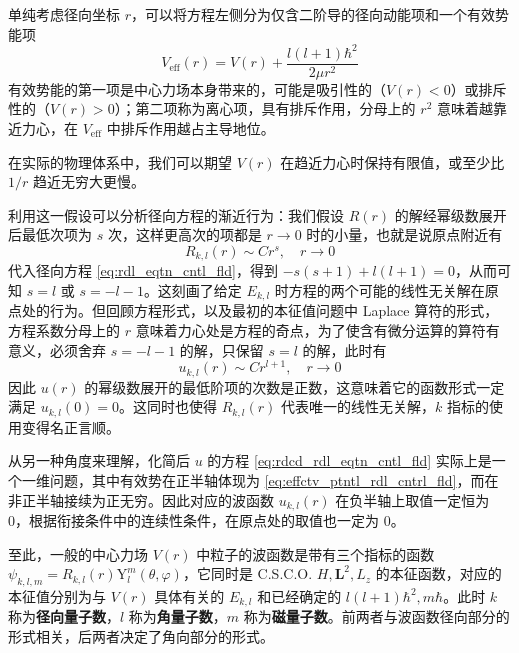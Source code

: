\documentclass[cn,10pt,math=newtx,citestyle=gb7714-2015,bibstyle=gb7714-2015]{elegantbook}
\def\bm{\boldsymbol}
\def\mr{\mathrm}
\def\vphi{\varphi}
\def\ra{\rightarrow}
\begin{document}
单纯考虑径向坐标 $r$，可以将方程左侧分为仅含二阶导的径向动能项和一个有效势能项
\begin{equation}\label{eq:effctv_ptntl_rdl_cntrl_fld}
    V_\text{eff}(r)=V(r)+\frac{l(l+1)\hbar^2}{2\mu r^2}
\end{equation}
有效势能的第一项是中心力场本身带来的，可能是吸引性的（$V(r)<0$）或排斥性的（$V(r)>0$）；第二项称为离心项，具有排斥作用，分母上的 $r^2$ 意味着越靠近力心，在 $V_\text{eff}$ 中排斥作用越占主导地位。

\begin{assumption}
在实际的物理体系中，我们可以期望 $V(r)$ 在趋近力心时保持有限值，或至少比 $1/r$ 趋近无穷大更慢。
\end{assumption}

利用这一假设可以分析径向方程的渐近行为：我们假设 $R(r)$ 的解经幂级数展开后最低次项为 $s$ 次，这样更高次的项都是 $r\ra 0$ 时的小量，也就是说原点附近有
\begin{equation}
    R_{k,l}(r)\sim Cr^s,\quad r\ra 0
\end{equation}
代入径向方程 \ref{eq:rdl_eqtn_cntl_fld}，得到 $-s(s+1)+l(l+1)=0$，从而可知 $s=l$ 或 $s=-l-1$。这刻画了给定 $E_{k,l}$ 时方程的两个可能的线性无关解在原点处的行为。但回顾方程形式，以及最初的本征值问题中 Laplace 算符的形式，方程系数分母上的 $r$ 意味着力心处是方程的奇点，为了使含有微分运算的算符有意义，必须舍弃 $s=-l-1$ 的解，只保留 $s=l$ 的解，此时有
\begin{equation}
    u_{k,l}(r)\sim Cr^{l+1},\quad r\ra 0
\end{equation}
因此 $u(r)$ 的幂级数展开的最低阶项的次数是正数，这意味着它的函数形式一定满足 $u_{k,l}(0)=0$。这同时也使得 $R_{k,l}(r)$ 代表唯一的线性无关解，$k$ 指标的使用变得名正言顺。

\begin{remark}
从另一种角度来理解，化简后 $u$ 的方程  \ref{eq:rdcd_rdl_eqtn_cntl_fld} 实际上是一个一维问题，其中有效势在正半轴体现为 \ref{eq:effctv_ptntl_rdl_cntrl_fld}，而在非正半轴接续为正无穷。因此对应的波函数 $u_{k,l}(r)$ 在负半轴上取值一定恒为 0，根据衔接条件中的连续性条件，在原点处的取值也一定为 0。
\end{remark}

\begin{conclusion}
至此，一般的中心力场 $V(r)$ 中粒子的波函数是带有三个指标的函数 $\psi_{k,l,m}=R_{k,l}(r)\mr Y_l^m(\theta,\vphi)$，它同时是 C.S.C.O. $H,\bm L^2,L_z$ 的本征函数，对应的本征值分别为与 $V(r)$ 具体有关的 $E_{k,l}$ 和已经确定的 $l(l+1)\hbar^2,m\hbar$。此时 $k$ 称为\textbf{径向量子数}，$l$ 称为\textbf{角量子数}，$m$ 称为\textbf{磁量子数}。前两者与波函数径向部分的形式相关，后两者决定了角向部分的形式。
\end{conclusion}
\end{document}
